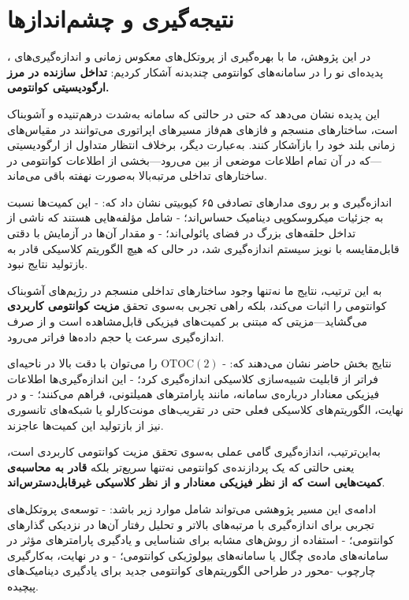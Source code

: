 \section{نتیجه‌گیری و چشم‌اندازها}
\label{sec:conclusion}

در این پژوهش، ما با بهره‌گیری از پروتکل‌های معکوس زمانی و اندازه‌گیری‌های ، پدیده‌ای نو را در سامانه‌های کوانتومی چندبدنه آشکار کردیم:  
\textbf{تداخل سازنده در مرز ارگودیسیتی کوانتومی.}

این پدیده نشان می‌دهد که حتی در حالتی که سامانه به‌شدت درهم‌تنیده و آشوبناک است، ساختارهای منسجم و فازهای هم‌فاز مسیرهای اپراتوری می‌توانند در مقیاس‌های زمانی بلند خود را بازآشکار کنند.  
به‌عبارت دیگر، برخلاف انتظار متداول از ارگودیسیتی—که در آن تمام اطلاعات موضعی از بین می‌رود—بخشی از اطلاعات کوانتومی در ساختارهای تداخلی مرتبه‌بالا به‌صورت نهفته باقی می‌ماند.

اندازه‌گیری  و  بر روی مدارهای تصادفی ۶۵ کیوبیتی نشان داد که:
- این کمیت‌ها نسبت به جزئیات میکروسکوپی دینامیک حساس‌اند؛  
- شامل مؤلفه‌هایی هستند که ناشی از تداخل حلقه‌های بزرگ در فضای پائولی‌اند؛  
- و مقدار آن‌ها در آزمایش با دقتی قابل‌مقایسه با نویز سیستم اندازه‌گیری شد، در حالی که هیچ الگوریتم کلاسیکی قادر به بازتولید نتایج نبود.

به این ترتیب، نتایج ما نه‌تنها وجود ساختارهای تداخلی منسجم در رژیم‌های آشوبناک کوانتومی را اثبات می‌کند، بلکه راهی تجربی به‌سوی تحقق \textbf{مزیت کوانتومی کاربردی} می‌گشاید—مزیتی که مبتنی بر کمیت‌های فیزیکی قابل‌مشاهده است و از صرف اندازه‌گیری سرعت یا حجم داده‌ها فراتر می‌رود.

نتایج بخش حاضر نشان می‌دهند که:
- \(\mathrm{OTOC(2)}\) را می‌توان با دقت بالا در ناحیه‌ای فراتر از قابلیت شبیه‌سازی کلاسیکی اندازه‌گیری کرد؛  
- این اندازه‌گیری‌ها اطلاعات فیزیکی معنادار درباره‌ی سامانه، مانند پارامترهای همیلتونی، فراهم می‌کنند؛  
- و در نهایت، الگوریتم‌های کلاسیکی فعلی حتی در تقریب‌های مونت‌کارلو یا شبکه‌های تانسوری نیز از بازتولید این کمیت‌ها عاجزند.

به‌این‌ترتیب، اندازه‌گیری  گامی عملی به‌سوی تحقق مزیت کوانتومی کاربردی است، یعنی حالتی که یک پردازنده‌ی کوانتومی نه‌تنها سریع‌تر بلکه \textbf{قادر به محاسبه‌ی کمیت‌هایی است که از نظر فیزیکی معنا‌دار و از نظر کلاسیکی غیرقابل‌دسترس‌اند}. 

ادامه‌ی این مسیر پژوهشی می‌تواند شامل موارد زیر باشد:
- توسعه‌ی پروتکل‌های تجربی برای اندازه‌گیری  با مرتبه‌های بالاتر و تحلیل رفتار آن‌ها در نزدیکی گذارهای کوانتومی؛  
- استفاده از روش‌های مشابه برای شناسایی و یادگیری پارامترهای مؤثر در سامانه‌های ماده‌ی چگال یا سامانه‌های بیولوژیکی کوانتومی؛  
- و در نهایت، به‌کارگیری چارچوب -محور در طراحی الگوریتم‌های کوانتومی جدید برای یادگیری دینامیک‌های پیچیده.

